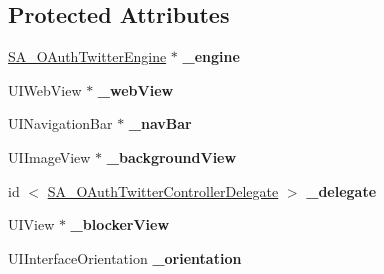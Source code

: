 \subsection*{\-Protected \-Attributes}
\begin{DoxyCompactItemize}
\item 
\hypertarget{interface_s_a___o_auth_twitter_controller_a29df3793258b3a09ec6b2ebc5cfad900}{
\hyperlink{interface_s_a___o_auth_twitter_engine}{\-S\-A\-\_\-\-O\-Auth\-Twitter\-Engine} $\ast$ {\bfseries \-\_\-engine}}
\label{interface_s_a___o_auth_twitter_controller_a29df3793258b3a09ec6b2ebc5cfad900}

\item 
\hypertarget{interface_s_a___o_auth_twitter_controller_a32027f8afb2b2e65a1debc736e98b4a4}{
\-U\-I\-Web\-View $\ast$ {\bfseries \-\_\-web\-View}}
\label{interface_s_a___o_auth_twitter_controller_a32027f8afb2b2e65a1debc736e98b4a4}

\item 
\hypertarget{interface_s_a___o_auth_twitter_controller_a0bd24cc3cebdaa99de43fb511f1ba152}{
\-U\-I\-Navigation\-Bar $\ast$ {\bfseries \-\_\-nav\-Bar}}
\label{interface_s_a___o_auth_twitter_controller_a0bd24cc3cebdaa99de43fb511f1ba152}

\item 
\hypertarget{interface_s_a___o_auth_twitter_controller_a6946f90be5d3bfcb423551fea1bbc988}{
\-U\-I\-Image\-View $\ast$ {\bfseries \-\_\-background\-View}}
\label{interface_s_a___o_auth_twitter_controller_a6946f90be5d3bfcb423551fea1bbc988}

\item 
\hypertarget{interface_s_a___o_auth_twitter_controller_a2abb9deff89b88983de46b84e596ef65}{
id\*
$<$ \hyperlink{protocol_s_a___o_auth_twitter_controller_delegate-p}{\-S\-A\-\_\-\-O\-Auth\-Twitter\-Controller\-Delegate} $>$ {\bfseries \-\_\-delegate}}
\label{interface_s_a___o_auth_twitter_controller_a2abb9deff89b88983de46b84e596ef65}

\item 
\hypertarget{interface_s_a___o_auth_twitter_controller_a678423da67edb13d9a3e45c925415a52}{
\-U\-I\-View $\ast$ {\bfseries \-\_\-blocker\-View}}
\label{interface_s_a___o_auth_twitter_controller_a678423da67edb13d9a3e45c925415a52}

\item 
\hypertarget{interface_s_a___o_auth_twitter_controller_aca6472d4957f5923b2bba038935d58f6}{
\-U\-I\-Interface\-Orientation {\bfseries \-\_\-orientation}}
\label{interface_s_a___o_auth_twitter_controller_aca6472d4957f5923b2bba038935d58f6}


\end{DoxyCompactItemize}
